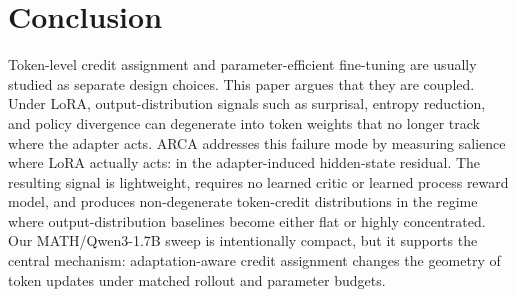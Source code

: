 \section{Conclusion}

Token-level credit assignment and parameter-efficient fine-tuning are usually
studied as separate design choices. This paper argues that they are coupled.
Under LoRA, output-distribution signals such as surprisal, entropy reduction,
and policy divergence can degenerate into token weights that no longer track
where the adapter acts. ARCA addresses this failure mode by measuring
salience where LoRA actually acts: in the adapter-induced hidden-state
residual. The resulting signal is lightweight, requires no learned critic or
learned process reward model, and produces non-degenerate token-credit distributions in
the regime where output-distribution baselines become either flat or highly
concentrated. Our MATH/Qwen3-1.7B sweep is intentionally compact, but it
supports the central mechanism: adaptation-aware credit assignment changes the
geometry of token updates under matched rollout and parameter budgets.
